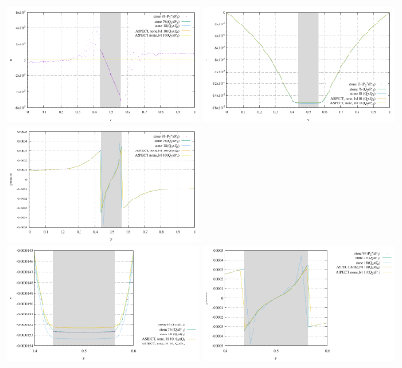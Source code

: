 \begin{center}
\includegraphics[width=5.6cm]{images/sinking_block/u_FS}
\includegraphics[width=5.6cm]{images/sinking_block/v_FS}
\includegraphics[width=5.6cm]{images/sinking_block/pressure_FS}\\
\includegraphics[width=5.6cm]{images/sinking_block/v_FS_zoom}
\includegraphics[width=5.6cm]{images/sinking_block/pressure_FS_zoom}\\
\end{center}


